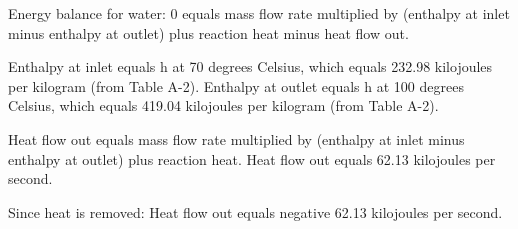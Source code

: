 Energy balance for water:  
0 equals mass flow rate multiplied by (enthalpy at inlet minus enthalpy at outlet) plus reaction heat minus heat flow out.  

Enthalpy at inlet equals h at 70 degrees Celsius, which equals 232.98 kilojoules per kilogram (from Table A-2).  
Enthalpy at outlet equals h at 100 degrees Celsius, which equals 419.04 kilojoules per kilogram (from Table A-2).  

Heat flow out equals mass flow rate multiplied by (enthalpy at inlet minus enthalpy at outlet) plus reaction heat.  
Heat flow out equals 62.13 kilojoules per second.  

Since heat is removed:  
Heat flow out equals negative 62.13 kilojoules per second.